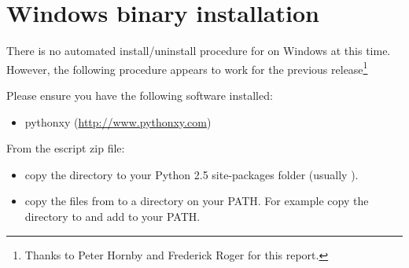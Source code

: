 %
%
%

\section{Windows binary installation}
\label{sec:binwin}

There is no automated install/uninstall procedure for \esfinley on Windows at this time.
However, the following procedure appears to work for the previous release\footnote{Thanks to Peter Hornby and Frederick Roger for this report.}

Please ensure you have the following software installed: 
\begin{itemize}
 \item pythonxy (\url{http://www.pythonxy.com})
\end{itemize}

From the escript zip file:
\begin{itemize}
\item 
 copy the  directory to your Python 2.5 site-packages folder (usually ).
\item 
 copy the  files from  to a directory on your PATH. For example copy the directory to  and add   to your PATH.
\end{itemize}

